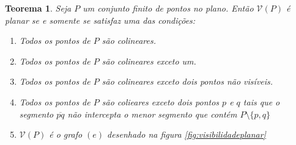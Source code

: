 \documentclass[a4paper]{book}
\newtheorem{teorema}{Teorema}[section]
\begin{document}
\begin{teorema}\cite{planar}\label{visibilidadeplanar}
    Seja $P$ um conjunto finito de pontos no plano. Então $\mathcal V(P)$ é planar se e somente se satisfaz uma das condições:
    \begin{enumerate}[label=(\alph*)]
        \item
            Todos os pontos de $P$ são colineares.
        \item
            Todos os pontos de $P$ são colineares exceto um.
        \item
            Todos os pontos de $P$ são colineares exceto dois pontos não visíveis.
        \item
            Todos os pontos de $P$ são colieares exceto dois pontos $p$ e $q$ tais que o segmento $\overline{pq}$ não intercepta o menor segmento que contém $P\setminus\{p,q\}$
        \item
            $\mathcal V(P)$ é o grafo $(e)$ desenhado na figura \ref{fig:visibilidadeplanar}
    \end{enumerate}
\end{teorema}
\end{document}
